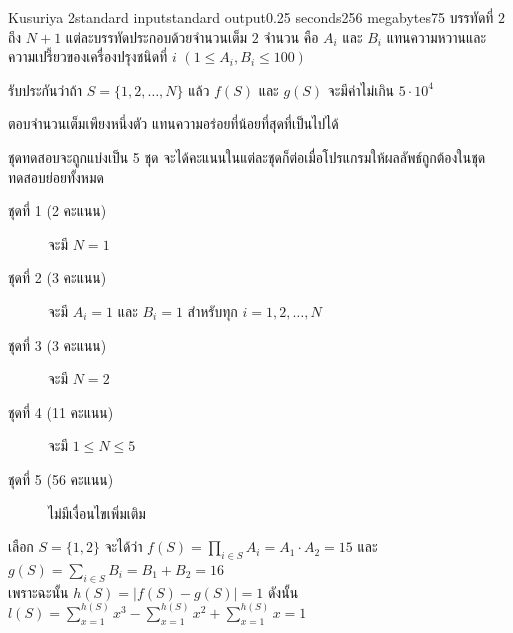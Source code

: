\documentclass[11pt,a4paper]{article}
\begin{document}
\begin{problem}{Kusuriya 2}{standard input}{standard output}{0.25 seconds}{256 megabytes}{75}
บรรทัดที่ $2$ ถึง $N+1$ แต่ละบรรทัดประกอบด้วยจำนวนเต็ม $2$ จำนวน คือ $A_i$ และ $B_i$ แทนความหวานและความเปรี้ยวของเครื่องปรุงชนิดที่ $i$ $(1\leq A_i,B_i\leq 100)$

รับประกันว่าถ้า $S=\{1,2,\ldots,N\}$ แล้ว $f(S)$ และ $g(S)$ จะมีค่าไม่เกิน $5\cdot 10^4$

\OutputFile
ตอบจำนวนเต็มเพียงหนึ่งตัว แทนความอร่อยที่น้อยที่สุดที่เป็นไปได้

\Scoring
ชุดทดสอบจะถูกแบ่งเป็น 5 ชุด จะได้คะแนนในแต่ละชุดก็ต่อเมื่อโปรแกรมให้ผลลัพธ์ถูกต้องในชุดทดสอบย่อยทั้งหมด

\begin{description}

\item[ชุดที่ 1 (2 คะแนน)] จะมี $N=1$
\item[ชุดที่ 2 (3 คะแนน)] จะมี $A_i=1$ และ $B_i=1$ สำหรับทุก $i=1,2,\ldots,N$
\item[ชุดที่ 3 (3 คะแนน)] จะมี $N=2$
\item[ชุดที่ 4 (11 คะแนน)] จะมี $1\leq N\leq 5$
\item[ชุดที่ 5 (56 คะแนน)] ไม่มีเงื่อนไขเพิ่มเติม

\end{description}

\Examples

\begin{example}
%
\end{example}

\Note

เลือก $S=\{1,2\}$ จะได้ว่า $f(S)=\prod\limits_{i\in S}A_i=A_1\cdot A_2=15$ และ $g(S)=\sum\limits_{i\in S}B_i=B_1+B_2=16$ \\เพราะฉะนั้น $h(S)=\left|f(S)-g(S)\right|=1$ ดังนั้น $l(S)=\sum\limits_{x=1}^{h(S)}x^3-\sum\limits_{x=1}^{h(S)}x^2+\sum\limits_{x=1}^{h(S)}x=1$

\end{problem}
\end{document}
